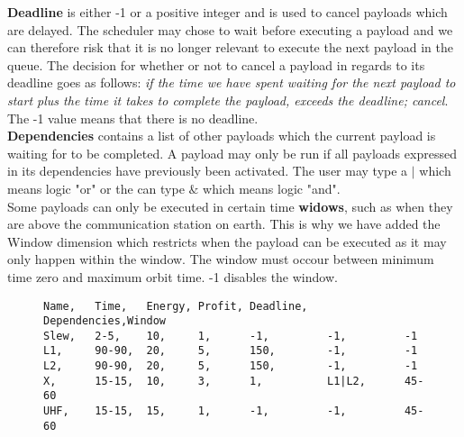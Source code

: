 \textbf{Deadline} is either -1 or a positive integer and is used to cancel payloads which are delayed.
The scheduler may chose to wait before executing a payload and we can therefore risk that it is no longer relevant to execute the next payload in the queue.
The decision for whether or not to cancel a payload in regards to its deadline goes as follows: \textit{if the time we have spent waiting for the next payload to start plus the time it takes to complete the payload, exceeds the deadline; cancel}.\\
The -1 value means that there is no deadline.\\
\textbf{Dependencies} contains a list of other payloads which the current payload is waiting for to be completed. A payload may only be run if all payloads expressed in its dependencies have previously been activated. The user may type a $|$ which means logic "or" or the can type $\&$ which means logic "and".\\
Some payloads can only be executed in certain time \textbf{widows}, such as when they are above the communication station on earth.
This is why we have added the Window dimension which restricts when the payload can be executed as it may only happen within the window. The window must occour between minimum time zero and maximum orbit time.
-1 disables the window.
\begin{figure}[H]
\begin{lstlisting}[caption={An example of how five payloads can be defined}, label=lst:csv, language=text]
Name,	Time,	Energy,	Profit,	Deadline,	Dependencies,Window
Slew,	2-5,	10,		1,		-1,			-1,			-1
L1,		90-90,	20,		5,		150,		-1,			-1
L2,		90-90,	20,		5,		150,		-1,			-1
X,		15-15,	10,		3,		1,			L1|L2,		45-60
UHF,	15-15,	15,		1,		-1,			-1,			45-60
\end{lstlisting}
\end{figure}

